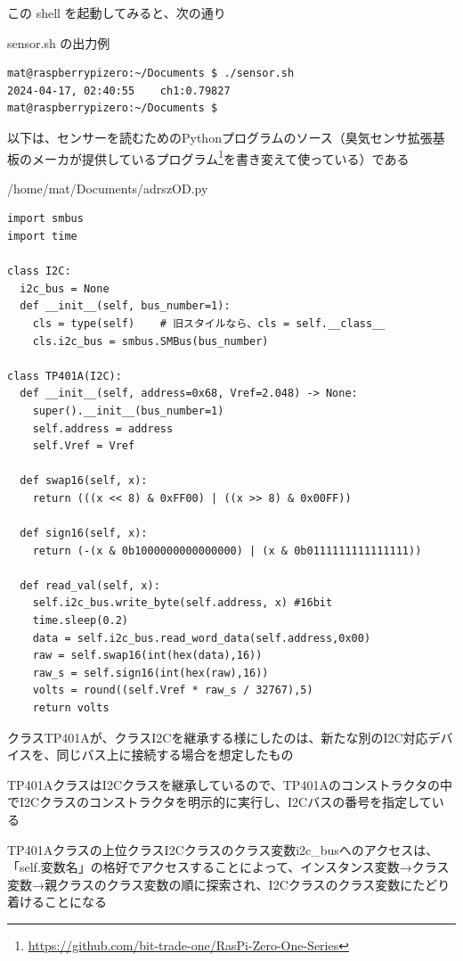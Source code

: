 \documentclass[12pt,a4paper,uplatex]{jsarticle}
\begin{document}
この shell を起動してみると、次の通り

\begin{itembox}[l]{sensor.sh の出力例}
	\begin{verbatim}
mat@raspberrypizero:~/Documents $ ./sensor.sh 
2024-04-17, 02:40:55	ch1:0.79827
mat@raspberrypizero:~/Documents $ 
	\end{verbatim}
\end{itembox}

以下は、センサーを読むためのPythonプログラムのソース（臭気センサ拡張基板のメーカが提供しているプログラム\footnote{\url{https://github.com/bit-trade-one/RasPi-Zero-One-Series}
}を書き変えて使っている）である

\begin{itembox}[l]{/home/mat/Documents/adrszOD.py}
	\begin{verbatim}
import smbus
import time

class I2C:
  i2c_bus = None
  def __init__(self, bus_number=1):
    cls = type(self)    # 旧スタイルなら、cls = self.__class__
    cls.i2c_bus = smbus.SMBus(bus_number) 

class TP401A(I2C):
  def __init__(self, address=0x68, Vref=2.048) -> None:
    super().__init__(bus_number=1)
    self.address = address
    self.Vref = Vref

  def swap16(self, x):
    return (((x << 8) & 0xFF00) | ((x >> 8) & 0x00FF))

  def sign16(self, x):
    return (-(x & 0b1000000000000000) | (x & 0b0111111111111111))

  def read_val(self, x):
    self.i2c_bus.write_byte(self.address, x) #16bit
    time.sleep(0.2)
    data = self.i2c_bus.read_word_data(self.address,0x00)
    raw = self.swap16(int(hex(data),16))
    raw_s = self.sign16(int(hex(raw),16))
    volts = round((self.Vref * raw_s / 32767),5)
    return volts
	\end{verbatim}
\end{itembox}


クラスTP401Aが、クラスI2Cを継承する様にしたのは、新たな別のI2C対応デバイスを、同じバス上に接続する場合を想定したもの

TP401AクラスはI2Cクラスを継承しているので、TP401Aのコンストラクタの中でI2Cクラスのコンストラクタを明示的に実行し、I2Cバスの番号を指定している

TP401Aクラスの上位クラスI2Cクラスのクラス変数i2c\_busへのアクセスは、「self.変数名」の格好でアクセスすることによって、インスタンス変数→クラス変数→親クラスのクラス変数の順に探索され、I2Cクラスのクラス変数にたどり着けることになる
\end{document}
